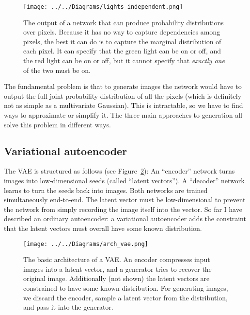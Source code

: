 \documentclass[11pt, a4paper, openany]{book}
\newcommand{\nquote}[1]{``{#1}''}
\begin{document}
\begin{figure}
  \centering
  \texttt{[image: ../../Diagrams/lights\_independent.png]}
  \caption[Output of a network that can produce probability distributions]{The output of a network that can produce probability distributions over pixels. Because it has no way to capture dependencies among pixels, the best it can do is to capture the marginal distribution of each pixel. It can specify that the green light can be on or off, and the red light can be on or off, but it cannot specify that \emph{exactly one} of the two must be on.}
  \label{independent}
\end{figure}

The fundamental problem is that to generate images the network would have to output the full joint probability distribution of all the pixels (which is definitely not as simple as a multivariate Gaussian). This is intractable, so we have to find ways to approximate or simplify it. The three main approaches to generation all solve this problem in different ways.

\subsection{Variational autoencoder}

The VAE \citep{vae} is structured as follows (see Figure~\ref{archvae}): An \nquote{encoder} network turns images into low-dimensional seeds (called \nquote{latent vectors}). A \nquote{decoder} network learns to turn the seeds back into images. Both networks are trained simultaneously end-to-end. The latent vector must be low-dimensional to prevent the network from simply recording the image itself into the vector. So far I have described an ordinary autoencoder: a variational autoencoder adds the constraint that the latent vectors must overall have some known distribution.

\begin{figure}
  \centering
  \texttt{[image: ../../Diagrams/arch\_vae.png]}
  \caption[Architecture of a VAE]{The basic architecture of a VAE. An encoder compresses input images into a latent vector, and a generator tries to recover the original image. Additionally (not shown) the latent vectors are constrained to have some known distribution. For generating images, we discard the encoder, sample a latent vector from the distribution, and pass it into the generator.}
  \label{archvae}
\end{figure}
\end{document}
